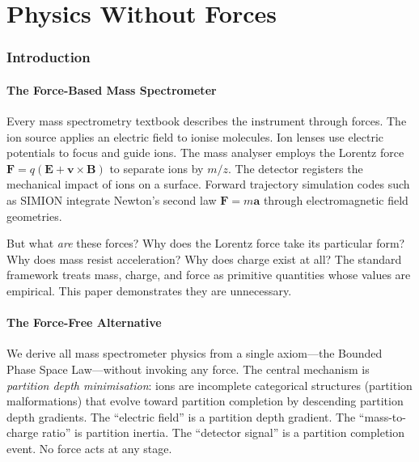 \documentclass[11pt,twocolumn,a4paper]{article}
\theoremstyle{definition}
\theoremstyle{remark}
\begin{document}

\part{Physics Without Forces}

\section{Introduction}
\label{sec:introduction}

\subsection{The Force-Based Mass Spectrometer}

Every mass spectrometry textbook \citep{gross2017, march2005} describes the instrument through forces. The ion source applies an electric field to ionise molecules. Ion lenses use electric potentials to focus and guide ions. The mass analyser employs the Lorentz force $\mathbf{F} = q(\mathbf{E} + \mathbf{v} \times \mathbf{B})$ to separate ions by $m/z$. The detector registers the mechanical impact of ions on a surface. Forward trajectory simulation codes such as SIMION \citep{dahl2000simion} integrate Newton's second law $\mathbf{F} = m\mathbf{a}$ through electromagnetic field geometries.

But what \emph{are} these forces? Why does the Lorentz force take its particular form? Why does mass resist acceleration? Why does charge exist at all? The standard framework treats mass, charge, and force as primitive quantities whose values are empirical. This paper demonstrates they are unnecessary.

\subsection{The Force-Free Alternative}

We derive all mass spectrometer physics from a single axiom---the Bounded Phase Space Law---without invoking any force. The central mechanism is \emph{partition depth minimisation}: ions are incomplete categorical structures (partition malformations) that evolve toward partition completion by descending partition depth gradients. The ``electric field'' is a partition depth gradient. The ``mass-to-charge ratio'' is partition inertia. The ``detector signal'' is a partition completion event. No force acts at any stage.
\end{document}

